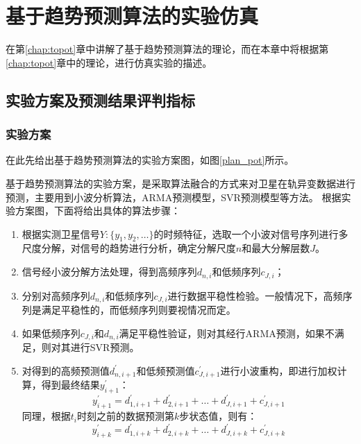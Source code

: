 
\chapter{基于趋势预测算法的实验仿真}
在第\ref{chap:topot}章中讲解了基于趋势预测算法的理论，而在本章中将根据第\ref{chap:topot}章中的理论，进行仿真实验的描述。

\section{实验方案及预测结果评判指标}
\subsection{实验方案}
在此先给出基于趋势预测算法的实验方案图，如图\ref{plan_pot}所示。

基于趋势预测算法的实验方案，是采取算法融合的方式来对卫星在轨异变数据进行预测，主要用到小波分析算法，ARMA预测模型，SVR预测模型等方法。
根据实验方案图，下面将给出具体的算法步骤：
\begin{enumerate}[label=（\arabic*）]
	\item 根据实测卫星信号$Y:\{ y_1, y_2,\dots \}$的时频特征，选取一个小波对信号序列进行多尺度分解，对信号的趋势进行分析，确定分解尺度$n$和最大分解层数$J$。
	\item 信号经小波分解方法处理，得到高频序列$d_{n,i}$和低频序列$c_{J,i}$；
	\item 分别对高频序列$d_{n,i}$和低频序列$c_{J,i}$进行数据平稳性检验。一般情况下，高频序列是满足平稳性的，而低频序列则要视情况而定。
	\item 如果低频序列$c_{J,i}$和$d_{n,i}$满足平稳性验证，则对其经行ARMA预测，如果不满足，则对其进行SVR预测。
	\item 对得到的高频预测值$d_{n,i+1}^\prime$和低频预测值$c_{J,i+1}^\prime$进行小波重构，即进行加权计算，得到最终结果$y_{i+1}^\prime$：
	$$ y_{i+1}^\prime = d_{1,i+1}^\prime + d_{2,i+1}^\prime + \dots +d_{J,i+1}^\prime + c_{J,i+1}^\prime$$
	同理，根据$t_i$时刻之前的数据预测第$k$步状态值，则有：
	\begin{equation}
	\label{equ:yipk}
		y_{i+k}^\prime = d_{1,i+k}^\prime + d_{2,i+k}^\prime + \dots +d_{J,i+k}^\prime + c_{J,i+k}^\prime
	\end{equation}
\end{enumerate}

